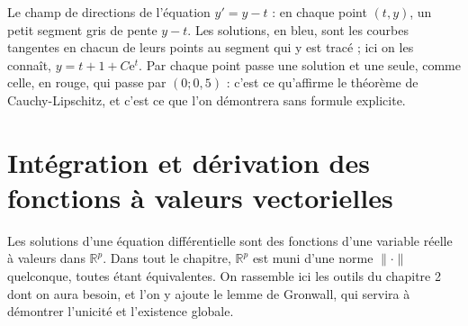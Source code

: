 \documentclass[a4paper,twoside]{report}
\newcommand{\R}{\mathbb{R}}
\newcommand{\ee}{\mathrm{e}}                      %
\newcommand{\norme}[1]{\lVert #1 \rVert}         %
\begin{document}
\begin{minipage}[c]{5.2cm}
\end{minipage}\hfill
\begin{minipage}[c]{9.4cm}
Le champ de directions de l'équation $y' = y - t$ : en chaque point $(t, y)$, un petit segment gris de pente $y - t$. Les solutions, en bleu, sont les courbes tangentes en chacun de leurs points au segment qui y est tracé ; ici on les connaît, $y = t + 1 + C\ee^{t}$. Par chaque point passe une solution et une seule, comme celle, en rouge, qui passe par $(0 ; 0{,}5)$ : c'est ce qu'affirme le théorème de Cauchy-Lipschitz, et c'est ce que l'on démontrera sans formule explicite.
\end{minipage}
\vfill
\newpage
\section[Fonctions à valeurs vectorielles]{Intégration et dérivation des fonctions à valeurs vectorielles}

Les solutions d'une équation différentielle sont des fonctions d'une variable réelle à valeurs dans $\R^{p}$. Dans tout le chapitre, $\R^{p}$ est muni d'une norme $\norme{\cdot}$ quelconque, toutes étant équivalentes. On rassemble ici les outils du chapitre 2 dont on aura besoin, et l'on y ajoute le lemme de Gronwall, qui servira à démontrer l'unicité et l'existence globale.
\end{document}
